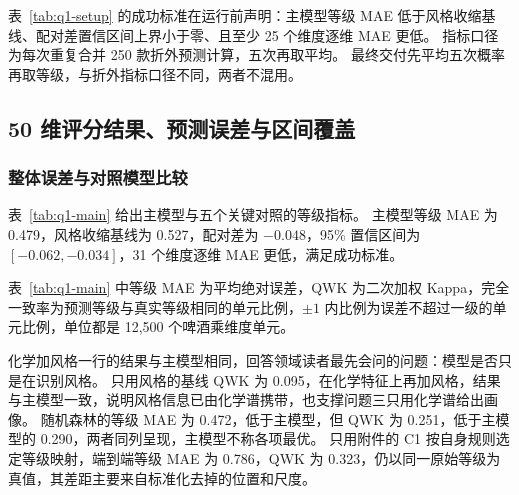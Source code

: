 表~\ref{tab:q1-setup} 的成功标准在运行前声明：主模型等级 MAE 低于风格收缩基线、配对差置信区间上界小于零、且至少 25 个维度逐维 MAE 更低。
指标口径为每次重复合并 250 款折外预测计算，五次再取平均。
最终交付先平均五次概率再取等级，与折外指标口径不同，两者不混用。

\subsection{50 维评分结果、预测误差与区间覆盖}

\subsubsection{整体误差与对照模型比较}

表~\ref{tab:q1-main} 给出主模型与五个关键对照的等级指标。
主模型等级 MAE 为 0.479，风格收缩基线为 0.527，配对差为 $-0.048$，95\% 置信区间为 $[-0.062,-0.034]$，31 个维度逐维 MAE 更低，满足成功标准。

\begin{table}[htbp]
\centering\small
\caption{问题一主结果与关键对照}
\label{tab:q1-main}
\end{table}

表~\ref{tab:q1-main} 中等级 MAE 为平均绝对误差，QWK 为二次加权 Kappa，完全一致率为预测等级与真实等级相同的单元比例，$\pm1$ 内比例为误差不超过一级的单元比例，单位都是 12,500 个啤酒乘维度单元。

化学加风格一行的结果与主模型相同，回答领域读者最先会问的问题：模型是否只是在识别风格。
只用风格的基线 QWK 为 0.095，在化学特征上再加风格，结果与主模型一致，说明风格信息已由化学谱携带，也支撑问题三只用化学谱给出画像。
随机森林的等级 MAE 为 0.472，低于主模型，但 QWK 为 0.251，低于主模型的 0.290，两者同列呈现，主模型不称各项最优。
只用附件的 C1 按自身规则选定等级映射，端到端等级 MAE 为 0.786，QWK 为 0.323，仍以同一原始等级为真值，其差距主要来自标准化去掉的位置和尺度。

